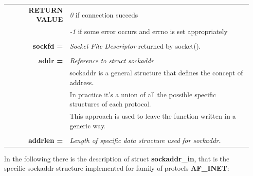 \begin{table}[h]
\centering
\begin{tabular}{rcl}
\textbf{RETURN VALUE} & \multicolumn{2}{l}{\textit{0} if connection succeds}\\
{} & \multicolumn{2}{l}{\textit{-1} if some error occurs and errno is set appropriately}\\
& & \\
\textbf{sockfd =} & \multicolumn{2}{l}{\textit{Socket File Descriptor} returned by socket().}\\
& &\\
\textbf{addr =} & \multicolumn{2}{l}{\textit{Reference to struct sockaddr}}\\
{} & \multicolumn{2}{l}{sockaddr is a general structure that defines the concept of address.}\\
{} & \multicolumn{2}{l}{In practice it's a union of all the possible specific structures of each protocol.}\\
{} & \multicolumn{2}{l}{This approach is used to leave the function written in a generic way.}\\
& & \\
\textbf{addrlen =} & \multicolumn{2}{l}{\textit{Length of specific data structure used for sockaddr.}}\\
\end{tabular}
\end{table}
In the following there is the description of struct \textbf{sockaddr\_in}, that is the specific sockaddr structure implemented for family of protocls \textbf{AF\_INET}:

